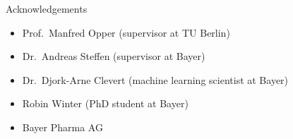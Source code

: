 \documentclass[Nike]{tuberlinbeamer}
\begin{document}
\begin{frame}{Acknowledgements}
  \begin{itemize}
    \item Prof.\ Manfred Opper (supervisor at TU Berlin)
    \item Dr.\ Andreas Steffen (supervisor at Bayer)
    \item Dr.\ Djork-Arne Clevert (machine learning scientist at Bayer)
    \item Robin Winter (PhD student at Bayer)
    \item Bayer Pharma AG
  \end{itemize}

\end{frame}
\end{document}
